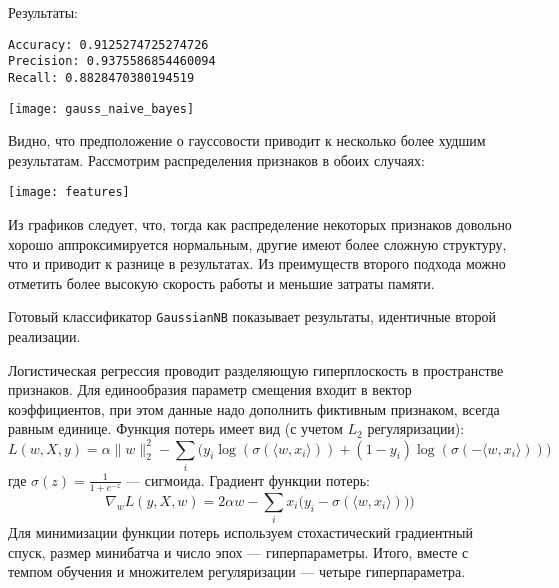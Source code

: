 Результаты:

\begin{lstlisting}[frame=none, numbers=none]
Accuracy: 0.9125274725274726
Precision: 0.9375586854460094
Recall: 0.8828470380194519
\end{lstlisting}
\texttt{[image: gauss\_naive\_bayes]}

Видно, что предположение о гауссовости приводит к несколько более худшим результатам. Рассмотрим распределения признаков в обоих случаях:

\texttt{[image: features]}

Из графиков следует, что, тогда как распределение некоторых признаков довольно хорошо аппроксимируется нормальным, другие имеют более сложную структуру, что и приводит к разнице в результатах. Из преимуществ второго подхода можно отметить более высокую скорость работы и меньшие затраты памяти.

Готовый классификатор {\tt GaussianNB} показывает результаты, идентичные второй реализации.

Логистическая регрессия проводит разделяющую гиперплоскость в пространстве признаков. Для единообразия параметр смещения входит в вектор коэффициентов, при этом данные надо дополнить фиктивным признаком, всегда равным единице. Функция потерь имеет вид (с учетом $L_2$ регуляризации):
$$L(w, X, y) = \alpha\|w\|^2_2 - \sum_i \big( y_i \log(\sigma(\langle w, x_i \rangle)) + (1 - y_i) \log(\sigma(-\langle w, x_i \rangle)) \big)$$
где $\sigma(z) = \frac1{1 + e^{-z}}$ --- сигмоида. Градиент функции потерь:
$$\nabla_w L(y, X, w) = 2 \alpha w - \sum_i x_i \big( y_i - \sigma(\langle w, x_i \rangle)) \big)$$
Для минимизации функции потерь используем стохастический градиентный спуск, размер минибатча и число эпох --- гиперпараметры. Итого, вместе с темпом обучения и множителем регуляризации --- четыре гиперпараметра.


